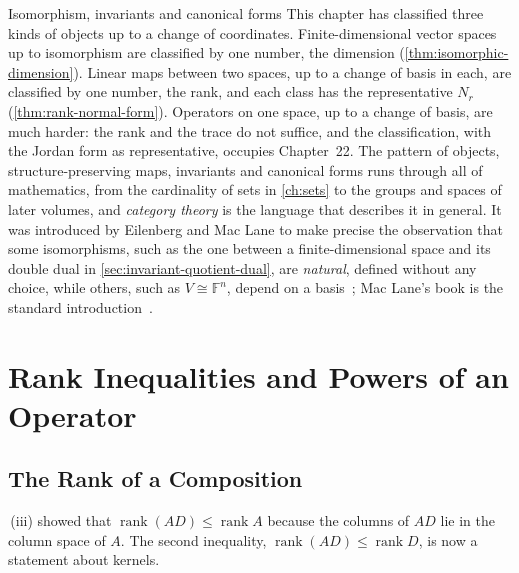 \begin{note}{Isomorphism, invariants and canonical forms}
This chapter has classified three kinds of objects up to a change of coordinates. Finite-dimensional vector spaces up to isomorphism are classified by one number, the dimension (\cref{thm:isomorphic-dimension}). Linear maps between two spaces, up to a change of basis in each, are classified by one number, the rank, and each class has the representative $N_r$ (\cref{thm:rank-normal-form}). Operators on one space, up to a change of basis, are much harder: the rank and the trace do not suffice, and the classification, with the Jordan form as representative, occupies Chapter~22. The pattern of objects, structure-preserving maps, invariants and canonical forms runs through all of mathematics, from the cardinality of sets in \cref{ch:sets} to the groups and spaces of later volumes, and \emph{category theory} is the language that describes it in general. It was introduced by Eilenberg and Mac Lane to make precise the observation that some isomorphisms, such as the one between a finite-dimensional space and its double dual in \cref{sec:invariant-quotient-dual}, are \emph{natural}, defined without any choice, while others, such as $V\cong\mathbb F^n$, depend on a basis~\cite{eilenberg1945}; Mac Lane's book is the standard introduction~\cite{maclane1998}.
\end{note}

\section{Rank Inequalities and Powers of an Operator}
\label{sec:rank-inequalities}

\subsection{The Rank of a Composition}

\,(iii) showed that $\operatorname{rank}(AD)\le\operatorname{rank}A$ because the columns of $AD$ lie in the column space of $A$. The second inequality, $\operatorname{rank}(AD)\le\operatorname{rank}D$, is now a statement about kernels.

